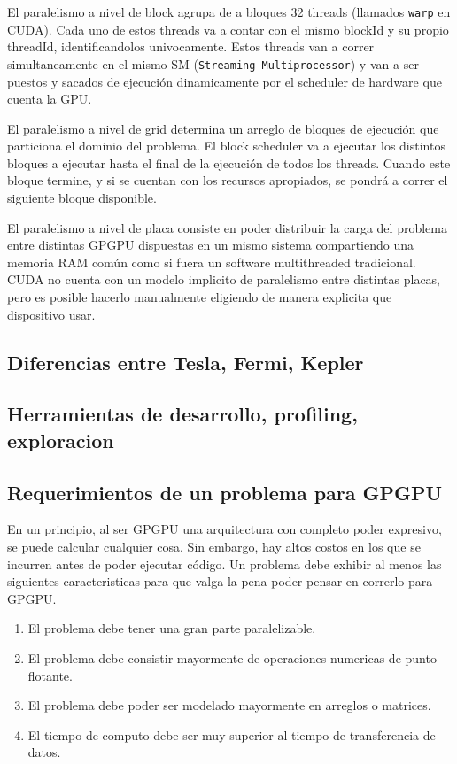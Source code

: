 El paralelismo a nivel de block agrupa de a bloques 32 threads (llamados \texttt{warp} en CUDA).
Cada uno de estos threads va a contar con el mismo blockId y su propio threadId, identificandolos univocamente.
Estos threads van a correr simultaneamente en el mismo SM (\texttt{Streaming Multiprocessor}) y
van a ser puestos y sacados de ejecuci\'on dinamicamente por el scheduler de hardware que cuenta la GPU.

El paralelismo a nivel de grid determina un arreglo de bloques de ejecuci\'on que particiona
el dominio del problema. El block scheduler va a ejecutar los distintos bloques a ejecutar hasta
el final de la ejecuci\'on de todos los threads. Cuando este bloque termine, y si se cuentan con
los recursos apropiados, se pondr\'a a correr el siguiente bloque disponible.

El paralelismo a nivel de placa consiste en poder distribuir la carga del problema entre distintas
GPGPU dispuestas en un mismo sistema compartiendo una memoria RAM com\'un como si fuera un software
multithreaded tradicional. CUDA no cuenta con un modelo implicito de paralelismo entre distintas placas,
pero es posible hacerlo manualmente eligiendo de manera explicita que dispositivo usar.

\subsection{Diferencias entre Tesla, Fermi, Kepler}

\subsection{Herramientas de desarrollo, profiling, exploracion}

\subsection{Requerimientos de un problema para GPGPU}
En un principio, al ser GPGPU una arquitectura con completo poder expresivo, se puede
calcular cualquier cosa. Sin embargo, hay altos costos en los que se incurren antes de
poder ejecutar c\'odigo. Un problema debe exhibir al menos las siguientes caracteristicas
para que valga la pena poder pensar en correrlo para GPGPU.
\begin{enumerate}
  \item \label{req:paralelo} El problema debe tener una gran parte paralelizable.
  \item \label{req:float} El problema debe consistir mayormente de operaciones numericas de punto flotante.
  \item \label{req:matrix} El problema debe poder ser modelado mayormente en arreglos o matrices.
  \item \label{req:transf} El tiempo de computo debe ser muy superior al tiempo de transferencia de datos.
\end{enumerate}


